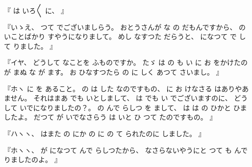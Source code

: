 
%
『
は
いろ〳〵
に、
』

%
『いゝえ、
%
つて
でございましらう。
%
おとうさんが
な
の
だもんですから、
%
の
いことばかり
すやうになりまして。
%
めし
なすつた
だらうと、
%
になつて
で
して
りました。
』

%
『イヤ、
%
どうして
なことを
ふものですか。
%
たゞ
は
の
も
い
に
お
をかけたのが
まぬ
な
が
ます。
%
お
ひなすつたら
の
に
しく
あつて
さいまし。
』

%
『ホヽ
に
を
あること。
%
の
は
した
なのですもの、
%
に
お
けなさる
はありやあ
ません。
%
それはまあ
でも
いとしまして、
%
は
でも
い
でございますのに、
%
どうして
いでになりましたの？。
%
の
んで
らしつ
を
まして、
%
は
は
の
ひかと
ひましたよ。
%
だつて
が
いでなさらう
は
いと
ひ
つて
たのですもの。
』

%
『ハヽヽ、
%
はまた
の
にか
の
に
の
て
られたのに
しました。
』

%
『ホヽヽ、
%
が
になつて
んで
らしつたから、
%
なさらないやうにと
つて
も
んで
りましたのよ。
』

